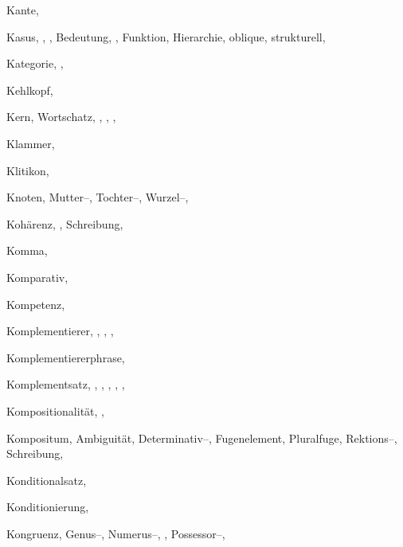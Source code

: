 \begin{theindex}
  \item Kante, 
  \item Kasus, , , 
    \subitem Bedeutung, , 
    \subitem Funktion, 
    \subitem Hierarchie, 
    \subitem oblique, 
    \subitem strukturell, 
  \item Kategorie, , 
  \item Kehlkopf, 
  \item Kern, 
    \subitem Wortschatz, , , 
		, 
  \item Klammer, 
  \item Klitikon, 
  \item Knoten, 
    \subitem Mutter--, 
    \subitem Tochter--, 
    \subitem Wurzel--, 
  \item Kohärenz, , 
    \subitem Schreibung, 
  \item Komma, 
  \item Komparativ, 
  \item Kompetenz, 
  \item Komplementierer, , , 
		, 
  \item Komplementiererphrase, 
  \item Komplementsatz, , , 
		, , , 
  \item Kompositionalität, , 
  \item Kompositum, 
    \subitem Ambiguität, 
    \subitem Determinativ--, 
    \subitem Fugenelement, 
    \subitem Pluralfuge, 
    \subitem Rektions--, 
    \subitem Schreibung, 
  \item Konditionalsatz, 
  \item Konditionierung, 
  \item Kongruenz, 
    \subitem Genus--, 
    \subitem Numerus--, , 
    \subitem Possessor--, 

\end{theindex}
